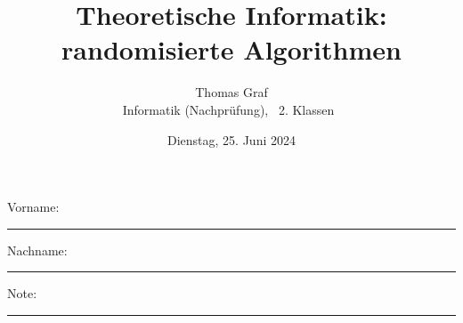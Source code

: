 \newtoggle{withbonus}  %

\newcommand{\mycourse}{Informatik (Nachprüfung)}
\newcommand{\myclass}{\faPeace\faIceCream~2. Klassen~\faIceCream\faPeace}
\newcommand{\mydate}{Dienstag, 25. Juni 2024}

\title{\textbf{Theoretische Informatik: randomisierte Algorithmen}}
\author{Thomas Graf\\
\mycourse, \myclass}
\date{\mydate}
\maketitle
\thispagestyle{headandfoot}		

\begin{center}
\end{center}
\vspace{10mm}

\begin{center}
	Vorname: \rule{45mm}{0.8pt}\qquad Nachname: \rule{45mm}{0.8pt}
\end{center}
\vspace{20mm}

\begin{center}
	\iftoggle{withbonus} {
		\combinedgradetable[h][questions]
	} {
		\gradetable[h][questions]
	}
\end{center}
\vspace{15mm}
\begin{center}
	Note: 
	\vspace{10mm}
	
	\rule{8mm}{1.2pt}
\end{center}
\clearpage


